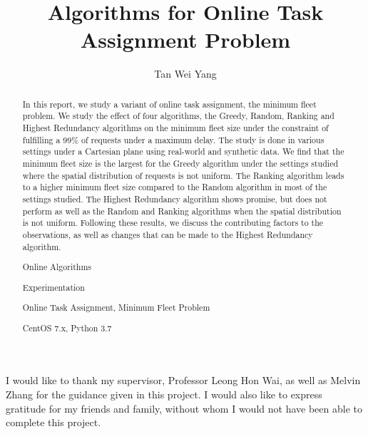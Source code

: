 \documentclass[urop]{socreport}
\begin{document}
\title{Algorithms for Online Task Assignment Problem}
\author{Tan Wei Yang}

\newcommand{\A}{\mathcal{A}}
\newcommand{\R}{\mathcal{R}}
\newcommand{\W}{\mathcal{W}}
	
\maketitle
\begin{abstract}
In this report, we study a variant of online task assignment, the minimum fleet problem. We study the effect of four algorithms, the Greedy, Random, Ranking and Highest Redundancy algorithms on the minimum fleet size under the constraint of fulfilling a 99\% of requests under a maximum delay. The study is done in various settings under a Cartesian plane using real-world and synthetic data. We find that the minimum fleet size is the largest for the Greedy algorithm under the settings studied where the spatial distribution of requests is not uniform. The Ranking algorithm leads to a higher minimum fleet size compared to the Random algorithm in most of the settings studied. The Highest Redundancy algorithm shows promise, but does not perform as well as the Random and Ranking algorithms when the spatial distribution is not uniform. Following these results, we discuss the contributing factors to the observations, as well as changes that can be made to the Highest Redundancy algorithm.

\begin{descriptors}
    \item Online Algorithms
    \item Experimentation
\end{descriptors}
\begin{keywords}
	Online Task Assignment, Minimum Fleet Problem
\end{keywords}
\begin{implement}
	CentOS 7.x, Python 3.7
\end{implement}
\end{abstract}

\begin{acknowledgement}
   I would like to thank my supervisor, Professor Leong Hon Wai, as well as Melvin Zhang for the guidance given in this project. I would also like to express gratitude for my friends and family, without whom I would not have been able to complete this project.
\end{acknowledgement}
\end{document}

